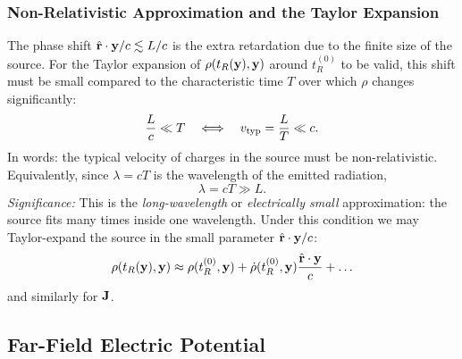 \subsubsection*{Non-Relativistic Approximation and the Taylor Expansion}
The phase shift $\hat{\mathbf{r}}\cdot\mathbf{y}/c \lesssim L/c$ is the extra retardation due to
the finite size of the source. For the Taylor expansion of $\rho(t_R(\mathbf{y}),\mathbf{y})$
around $t_R^{(0)}$ to be valid, this shift must be small compared to the characteristic
time $T$ over which $\rho$ changes significantly:
\begin{equation}\label{eq:lec21-nonrel-condition}
  \frac{L}{c} \ll T \quad\Longleftrightarrow\quad
  v_{\rm typ} = \frac{L}{T} \ll c.
\end{equation}
In words: the typical velocity of charges in the source must be non-relativistic.
Equivalently, since $\lambda = cT$ is the wavelength of the emitted radiation,
\begin{equation}\label{eq:lec21-wavelength}
  \boxed{\lambda = cT \gg L.}
\end{equation}
\textit{Significance:} This is the \emph{long-wavelength} or \emph{electrically small}
approximation: the source fits many times inside one wavelength. Under this condition
we may Taylor-expand the source in the small parameter $\hat{\mathbf{r}}\cdot\mathbf{y}/c$:
\begin{equation}\label{eq:lec21-taylor-rho}
  \rho(t_R(\mathbf{y}),\mathbf{y})
  \approx \rho(t_R^{(0)},\mathbf{y})
  + \dot\rho(t_R^{(0)},\mathbf{y})\frac{\hat{\mathbf{r}}\cdot\mathbf{y}}{c}
  + \ldots
\end{equation}
and similarly for $\mathbf{J}$.


\subsection{Far-Field Electric Potential}
\label{subsec:lec21-farfield-phi}

